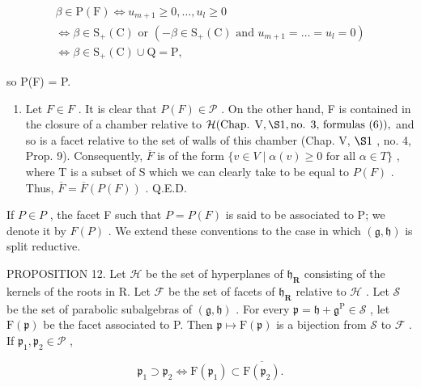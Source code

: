 \[
\begin{array}{c} \beta \in \mathrm{P} (\mathrm{F}) \Longleftrightarrow u _ {m + 1} \geq 0, \ldots , u _ {l} \geq 0 \\ \Longleftrightarrow \beta \in \mathrm{S} _ {+} (\mathrm{C}) \text {   or   } (- \beta \in \mathrm{S} _ {+} (\mathrm{C}) \text {   and   } u _ {m + 1} = \ldots = u _ {l} = 0) \\ \Longleftrightarrow \beta \in \mathrm{S} _ {+} (\mathrm{C}) \cup \mathrm{Q} = \mathrm{P}, \end{array}
\]

so P(F) = P.

\begin{enumerate}
\def\labelenumi{\alph{enumi})}
\setcounter{enumi}{1}
\tightlist
\item
  Let \(F \in F\) . It is clear that \(P(F) \in \mathcal{P}\) . On the other hand, F is contained in the closure of a chamber relative to \(\mathcal{H}(\text{Chap. V}, \S1, \text{no. 3, formulas (6)}),\) and so is a facet relative to the set of walls of this chamber (Chap. V, \(\S1\) , no. 4, Prop. 9). Consequently, \(\overline{F}\) is of the form \(\{v \in V \mid \alpha(v) \geq 0 \text{ for all } \alpha \in T\}\) , where T is a subset of S which we can clearly take to be equal to \(P(F)\) . Thus, \(\overline{F} = \overline{F}(P(F))\) . Q.E.D.
\end{enumerate}

If \(P \in P\) , the facet F such that \(P = P(F)\) is said to be associated to P; we denote it by \(F(P)\) . We extend these conventions to the case in which \((\mathfrak{g}, \mathfrak{h})\) is split reductive.

PROPOSITION 12. Let \(\mathcal{H}\) be the set of hyperplanes of \(\mathfrak{h}_{\mathbf{R}}\) consisting of the kernels of the roots in R. Let \(\mathcal{F}\) be the set of facets of \(\mathfrak{h}_{\mathbf{R}}\) relative to \(\mathcal{H}\) . Let \(\mathcal{S}\) be the set of parabolic subalgebras of \((\mathfrak{g},\mathfrak{h})\) . For every \(\mathfrak{p} = \mathfrak{h} + \mathfrak{g}^{\mathrm{P}}\in \mathcal{S}\) , let \(\mathrm{F}(\mathfrak{p})\) be the facet associated to P. Then \(\mathfrak{p}\mapsto \mathrm{F}(\mathfrak{p})\) is a bijection from \(\mathcal{S}\) to \(\mathcal{F}\) . If \(\mathfrak{p}_1,\mathfrak{p}_2\in \mathcal{P}\) ,

\[
\mathfrak {p} _ {1} \supset \mathfrak {p} _ {2} \Longleftrightarrow \mathrm{F} (\mathfrak {p} _ {1}) \subset \overline {{\mathrm{F} (\mathfrak {p} _ {2})}}.
\]

